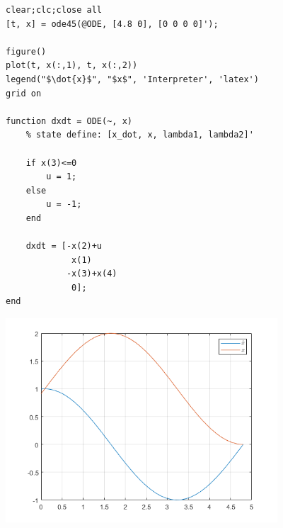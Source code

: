 \documentclass[12pt]{article}
\begin{document}



\begin{verbatim}
clear;clc;close all
[t, x] = ode45(@ODE, [4.8 0], [0 0 0 0]');

figure()
plot(t, x(:,1), t, x(:,2))
legend("$\dot{x}$", "$x$", 'Interpreter', 'latex')
grid on

function dxdt = ODE(~, x)
    % state define: [x_dot, x, lambda1, lambda2]'

    if x(3)<=0
        u = 1;
    else
        u = -1;
    end

    dxdt = [-x(2)+u
             x(1)
            -x(3)+x(4)
             0];
end
\end{verbatim}

\includegraphics [width=4in]{HW9_01.png}
\end{document}
